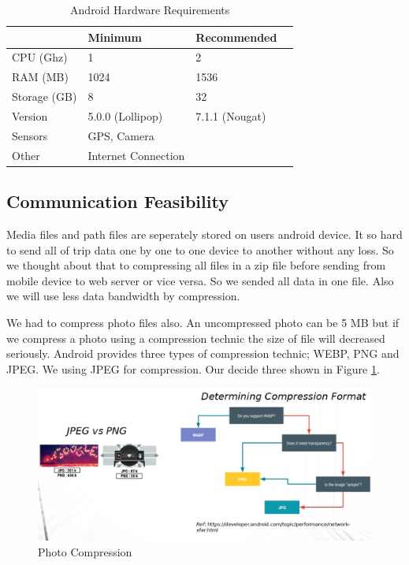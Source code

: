 \begin{table}[!ht]
\centering
\caption{Android Hardware Requirements}
\label{androidhardware}
\begin{tabular}{|l|l|l|l|}
\hline
            & \textbf{Minimum}    & \textbf{Recommended} \\\hline
CPU (Ghz) & \hfill 1      & \hfill 2     \\\hline
RAM (MB)      & \hfill 1024       & \hfill 1536        \\\hline
Storage (GB)   & \hfill 8     & \hfill 32       \\\hline
Version  & \hfill 5.0.0 (Lollipop)   & \hfill 7.1.1 (Nougat)      \\\hline
Sensors & GPS, Camera &  \\ \hline
Other & Internet Connection & \\ \hline
\end{tabular}
\end{table}

\newpage
\subsection{Communication Feasibility}

Media files and path files are seperately stored on users android device. It so hard to send all of trip data one by one to one device to another without any loss. So we thought about that to compressing all files in a zip file before sending from mobile device to web server or vice versa. So we sended all data in one file. Also we will use less data bandwidth by compression. 

We had to compress photo files also. An uncompressed photo can be 5 MB but if we compress a photo using a compression technic the size of file will decreased seriously. Android provides three types of compression technic; WEBP, PNG and JPEG. We using JPEG for compression. Our decide three shown in Figure \ref{fig:photoCompression}.

\begin{figure}[!htbp]
\centering
\includegraphics[width=\textwidth]{projectChapters/images/photoCompression.png}
\caption{Photo Compression}
\label{fig:photoCompression}
\end{figure}

